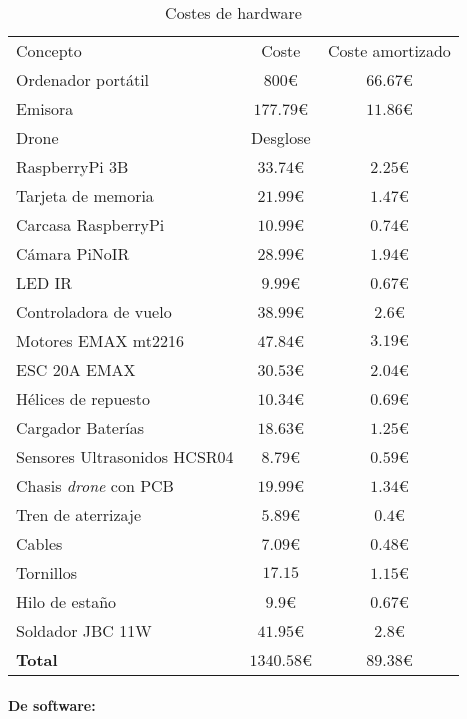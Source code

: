 \begin{table}[H]
	\begin{center}
		\begin{tabular}{l  c  c}\hline
			\toprule
			Concepto & Coste & Coste amortizado\\
			\otoprule
			Ordenador portátil & $800 $\euro & $66.67 $\euro\\
			Emisora & $177.79 $\euro & $11.86 $\euro\\
			Drone & Desglose & \\
			RaspberryPi 3B & $33.74 $\euro & $2.25 $\euro\\
			Tarjeta de memoria & $21.99 $\euro & $1.47 $\euro\\
			Carcasa RaspberryPi & $10.99 $\euro & $0.74 $\euro\\
			Cámara PiNoIR & $28.99 $\euro & $1.94 $\euro\\
			LED IR & $9.99 $\euro & $0.67 $\euro\\
			Controladora de vuelo & $38.99 $\euro & $2.6 $\euro\\
			Motores EMAX mt2216 & $47.84 $\euro &$3.19 \euro $\\
			ESC 20A EMAX & $30.53$\euro & $2.04 $\euro\\
			Hélices de repuesto & $10.34 $\euro & $0.69 $\euro\\
			Cargador Baterías & $18.63 $\euro & $1.25$\euro\\
			Sensores Ultrasonidos HCSR04 & $8.79$\euro & $0.59$\euro\\
			Chasis \emph{drone} con PCB & $19.99 $\euro & $1.34 $\euro\\
			Tren de aterrizaje & $5.89 $\euro & $0.4$\euro\\
			Cables & $7.09$\euro & $0.48$\euro\\
			Tornillos & $17.15$ & $1.15$\euro\\
			Hilo de estaño & $9.9$\euro & $0.67$\euro\\
			Soldador JBC 11W & $41.95$\euro & $2.8$\euro\\
			\hline
			\textbf{Total} & $1340.58 $\euro & $89.38$\euro\\
			\bottomrule
		\end{tabular}
		\caption{Costes de hardware}
		\label{tb:costesHardware}
	\end{center}
\end{table}


\paragraph{De software:}

